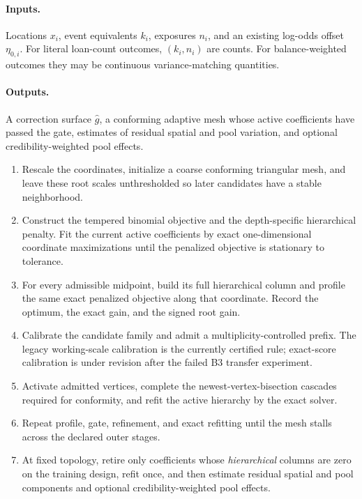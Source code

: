 \documentclass[11pt]{article}
\begin{document}
\paragraph{Inputs.} Locations $x_i$, event equivalents $k_i$, exposures $n_i$, and an existing
log-odds offset $\eta_{0,i}$. For literal loan-count outcomes, $(k_i,n_i)$ are counts. For
balance-weighted outcomes they may be continuous variance-matching quantities.

\paragraph{Outputs.} A correction surface $\hat g$, a conforming adaptive mesh whose active
coefficients have passed the gate, estimates of residual spatial and pool variation, and optional
credibility-weighted pool effects.

\begin{enumerate}[leftmargin=2em,itemsep=2pt]
\item Rescale the coordinates, initialize a coarse conforming triangular mesh, and leave these root
scales unthresholded so later candidates have a stable neighborhood.
\item Construct the tempered binomial objective and the depth-specific hierarchical penalty. Fit the
current active coefficients by exact one-dimensional coordinate maximizations until the penalized
objective is stationary to tolerance.
\item For every admissible midpoint, build its full hierarchical column and profile the same exact
penalized objective along that coordinate. Record the optimum, the exact gain, and the signed root
gain.
\item Calibrate the candidate family and admit a multiplicity-controlled prefix. The legacy
working-scale calibration is the currently certified rule; exact-score calibration is under
revision after the failed B3 transfer experiment.
\item Activate admitted vertices, complete the newest-vertex-bisection cascades required for
conformity, and refit the active hierarchy by the exact solver.
\item Repeat profile, gate, refinement, and exact refitting until the mesh stalls across the declared
outer stages.
\item At fixed topology, retire only coefficients whose \emph{hierarchical} columns are zero on the
training design, refit once, and then estimate residual spatial and pool components and optional
credibility-weighted pool effects.
\end{enumerate}
\end{document}
